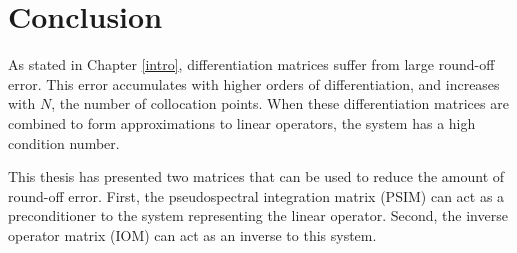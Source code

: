 \documentclass{sfuthesis}
\begin{document}
%
%
%
%


\chapter{Conclusion}

As stated in Chapter \ref{intro}, differentiation matrices suffer from large round-off error.
This error accumulates with higher orders of differentiation, and increases with $N$, the number of collocation points.
When these differentiation matrices are combined to form approximations to linear operators, the system has a high condition number.

This thesis has presented two matrices that can be used to reduce the amount of round-off error.
First, the pseudospectral integration matrix (PSIM) can act as a preconditioner to the system representing the linear operator.
Second, the inverse operator matrix (IOM) can act as an inverse to this system.
\end{document}
